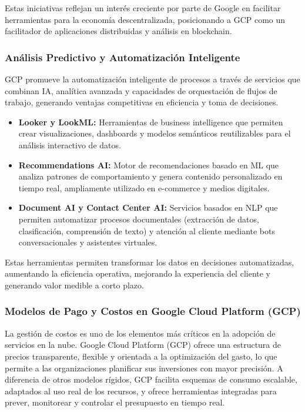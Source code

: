 {                Estas iniciativas reflejan un interés creciente por parte de Google en facilitar herramientas para la economía descentralizada, posicionando a GCP como un facilitador de aplicaciones distribuidas y análisis en blockchain.
                
            \subsubsection[Análisis y automatización]{Análisis Predictivo y Automatización Inteligente}
                GCP promueve la automatización inteligente de procesos a través de servicios que combinan IA, analítica avanzada y capacidades de orquestación de flujos de trabajo, generando ventajas competitivas en eficiencia y toma de decisiones.
                
                \begin{itemize}
                    \item \textbf{Looker y LookML:} Herramientas de business intelligence que permiten crear visualizaciones, dashboards y modelos semánticos reutilizables para el análisis interactivo de datos.
                    \item \textbf{Recommendations AI:} Motor de recomendaciones basado en ML que analiza patrones de comportamiento y genera contenido personalizado en tiempo real, ampliamente utilizado en e-commerce y medios digitales.
                    \item \textbf{Document AI y Contact Center AI:} Servicios basados en NLP que permiten automatizar procesos documentales (extracción de datos, clasificación, comprensión de texto) y atención al cliente mediante bots conversacionales y asistentes virtuales.
                \end{itemize}
                
                Estas herramientas permiten transformar los datos en decisiones automatizadas, aumentando la eficiencia operativa, mejorando la experiencia del cliente y generando valor medible a corto plazo.
                
            \subsubsection{Modelos de Pago y Costos en Google Cloud Platform (GCP)}
                La gestión de costos es uno de los elementos más críticos en la adopción de servicios en la nube. Google Cloud Platform (GCP) ofrece una estructura de precios transparente, flexible y orientada a la optimización del gasto, lo que permite a las organizaciones planificar sus inversiones con mayor precisión. A diferencia de otros modelos rígidos, GCP facilita esquemas de consumo escalable, adaptados al uso real de los recursos, y ofrece herramientas integradas para prever, monitorear y controlar el presupuesto en tiempo real.
                
}
